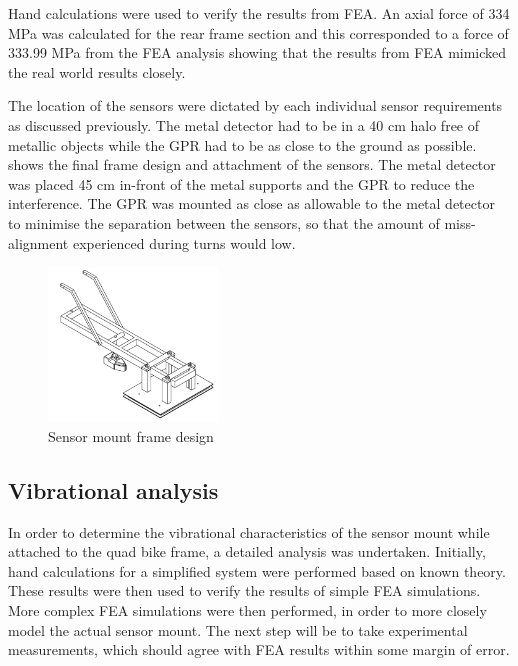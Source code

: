 \documentclass[main.tex]{subfiles}
\begin{document}
Hand calculations were used to verify the results from FEA. An axial force of 334 MPa was calculated for the rear frame section and this corresponded to a force of 333.99 MPa from the FEA analysis showing that the results from FEA mimicked the real world results closely. 

The location of the sensors were dictated by each individual sensor requirements as discussed previously. The metal detector had to be in a 40 cm halo free of metallic objects while the GPR had to be as close to the ground as possible.  shows the final frame design and attachment of the sensors. The metal detector was placed 45 cm in-front of the metal supports and the GPR to reduce the interference. The GPR was mounted as close as allowable to the metal detector to minimise the separation between the sensors, so that the amount of miss-alignment experienced during turns would low.  

\begin{figure}[ht]
\includegraphics[width=0.4\textwidth]{4-DetailedDesign/frame.PNG}
\centering
\caption{Sensor mount frame design} 
\end{figure} 

\subsection{Vibrational analysis}
In order to determine the vibrational characteristics of the sensor mount while attached to the quad bike frame, a detailed analysis was undertaken. Initially, hand calculations for a simplified system were performed based on known theory. These results were then used to verify the results of simple FEA simulations. More complex FEA simulations were then performed, in order to more closely model the actual sensor mount. The next step will be to take experimental measurements, which should agree with FEA results within some margin of error. 
 
\end{document}

